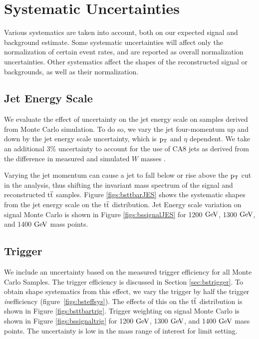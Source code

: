 \clearpage
\newpage
\chapter{Systematic Uncertainties}
\label{sec:bssystematics}
Various systematics are taken into account, both 
on our expected signal and background estimate. Some systematic uncertainties will affect only the normalization of certain event rates, 
and are reported as overall normalization uncertainties. Other systematics affect the shapes of the reconstructed signal or backgrounds, as well as their normalization.  

\section{Jet Energy Scale}
We evaluate the effect of uncertainty on the jet energy scale on samples derived from Monte Carlo simulation.  
To do so, we vary the jet four-momentum up and down by the jet energy 
scale uncertainty, which is $\mathrm{p_{T}}$ and $\eta$ dependent.  W‎e take an additional $3\%$ uncertainty to account 
for the use of CA8 jets as derived from the difference in measured and simulated $W$ masses \cite{ZP8TeV}. 

Varying the jet momentum can cause a jet to fall below or rise above the $\mathrm{p_{T}}$ cut in the analysis, thus shifting the invariant 
mass spectrum of the signal and reconstructed $\mathrm{t\overline{t}}$ samples. Figure \ref{figs:bsttbarJES} shows the systematic shapes from the 
jet energy scale on the $\mathrm{t\overline{t}}$ distribution.  Jet Energy scale variation on signal Monte Carlo is shown in Figure \ref{figs:bssignalJES} for 1200$~\mathrm{GeV}$,
 1300$~\mathrm{GeV}$, and 1400$~\mathrm{GeV}$ mass points.

\section{Trigger}
We include an uncertainty based on the measured trigger efficiency for all Monte Carlo Samples. The trigger efficiency is discussed in Section \ref{sec:bstrigger}. 
To obtain shape systematics from this effect, we vary the trigger by half the trigger \textit{in}efficiency (figure~\ref{figs:bsteffsys}). The effects of this on the $\mathrm{t\overline{t}}$ 
distribution is shown in Figure \ref{figs:bsttbartrig}. Trigger weighting on signal Monte Carlo is shown in Figure \ref{figs:bssignaltrig} for 1200$~\mathrm{GeV}$,
 1300$~\mathrm{GeV}$, and 1400$~\mathrm{GeV}$ mass points.  The uncertainty is low in the mass range of interest for limit setting.

